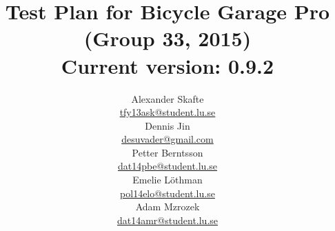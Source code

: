 \title{
	Test Plan for Bicycle Garage Pro\\
	(Group 33, 2015)\\
	\vspace{0.2in}
	\normalsize Current version: 0.9.2
}
\author{
	Alexander Skafte\\
	\url{tfy13ask@student.lu.se}\\
	Dennis Jin\\
	\url{desuvader@gmail.com}\\
	Petter Berntsson\\
	\url{dat14pbe@student.lu.se}\\
	Emelie Löthman\\
	\url{pol14elo@student.lu.se}\\
	Adam Mzrozek\\
	\url{dat14amr@student.lu.se}
}
\date{}
